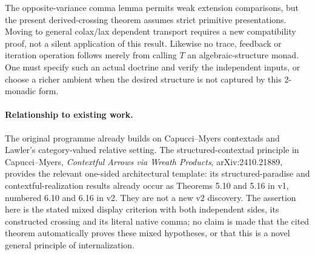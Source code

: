 \documentclass[11pt]{article}
\begin{document}
The opposite-variance comma lemma permits weak extension comparisons, but the present derived-crossing theorem assumes strict primitive presentations. Moving to general colax/lax dependent transport requires a new compatibility proof, not a silent application of this result. Likewise no trace, feedback or iteration operation follows merely from calling $T$ an algebraic-structure monad. One must specify such an actual doctrine and verify the independent inputs, or choose a richer ambient when the desired structure is not captured by this 2-monadic form.

\paragraph{Relationship to existing work.} The original programme already builds on Capucci--Myers contextads and Lawler's category-valued relative setting. The structured-contextad principle in Capucci--Myers, \emph{Contextful Arrows via Wreath Products}, arXiv:2410.21889, provides the relevant one-sided architectural template: its structured-paradise and contextful-realization results already occur as Theorems 5.10 and 5.16 in v1, numbered 6.10 and 6.16 in v2. They are not a new v2 discovery. The assertion here is the stated mixed display criterion with both independent sides, its constructed crossing and its literal native comma; no claim is made that the cited theorem automatically proves these mixed hypotheses, or that this is a novel general principle of internalization.
\end{document}
